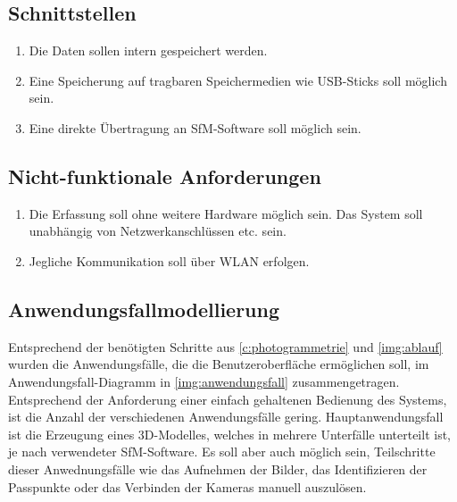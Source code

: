 \documentclass[./00PhotoBox.tex]{subfiles}
\begin{document}
\subsection{Schnittstellen}
\begin{enumerate}[label=S\arabic*]
  \item \label{e:intspeicher} Die Daten sollen intern gespeichert werden.
  \item \label{e:usbspeicher} Eine Speicherung auf tragbaren Speichermedien wie USB-Sticks soll möglich sein.
  \item \label{e:sfmsoftware} Eine direkte Übertragung an SfM-Software soll möglich sein.
\end{enumerate}

\subsection{Nicht-funktionale Anforderungen}
\begin{enumerate}[label=N\arabic*]
  \item \label{e:standalone} Die Erfassung soll ohne weitere Hardware möglich sein. Das System soll unabhängig von Netzwerkanschlüssen etc. sein.
  \item \label{e:wlan} Jegliche Kommunikation soll über WLAN erfolgen.
\end{enumerate}

\subsection{Anwendungsfallmodellierung}
\label{sec:Anwendungsfallmodellierung}

Entsprechend der benötigten Schritte aus \autoref{c:photogrammetrie} und \autoref{img:ablauf} wurden die Anwendungsfälle, die die Benutzeroberfläche ermöglichen soll, im Anwendungsfall-Dia\-gramm in \autoref{img:anwendungsfall} zusammengetragen. Entsprechend der Anforderung einer einfach gehaltenen Bedienung des Systems, ist die Anzahl der verschiedenen Anwendungsfälle gering. Hauptanwendungsfall ist die Erzeugung eines 3D-Modelles, welches in mehrere Unterfälle unterteilt ist, je nach verwendeter SfM-Software. Es soll aber auch möglich sein, Teilschritte dieser Anwednungsfälle wie das Aufnehmen der Bilder, das Identifizieren der Passpunkte oder das Verbinden der Kameras manuell auszulösen.
\end{document}

